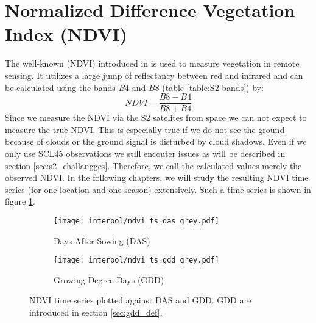 \section{Normalized Difference Vegetation Index (NDVI)}{%
	The well-known  ({NDVI}) introduced in \cite{rouseMonitoringVernalAdvancement1974} is used to measure vegetation in remote sensing. It utilizes a large jump of reflectancy between red and infrared and can be calculated using the bands $B4$ and $B8$ (table \ref{table:S2-bands}) by:
	\begin{equation}
		NDVI = \frac{B8 - B4}{B8 + B4}
		\label{eq:ndvi}
	\end{equation}
	Since we measure the NDVI via the S2 satelites from space we can not expect to measure the true NDVI. This is especially true if we do not see the ground because of clouds or the ground signal is disturbed by cloud shadows. Even if we only use SCL45 observations we still encouter issues as will be described in section \ref{sec:s2_challangges}. Therefore, we call the calculated values merely the {observed NDVI}. In the following chapters, we will study the resulting NDVI time series (for one location and one season) extensively. Such a time series is shown in figure \ref{interpol/ndvi_ts_das_grey.pdf}.
	\begin{figure}[!h]
		\centering
		\begin{subfigure}{.47\textwidth}
			\texttt{[image: interpol/ndvi\_ts\_das\_grey.pdf]}
			\caption{Days After Sowing (DAS)}
			\label{interpol/ndvi_ts_das_grey.pdf}
		\end{subfigure}%
		\hfill
		\begin{subfigure}{.47\textwidth}
			\texttt{[image: interpol/ndvi\_ts\_gdd\_grey.pdf]}
			\caption{Growing Degree Days (GDD)}
			\label{interpol/ndvi_ts_gdd_grey.pdf}
		\end{subfigure}
		\caption{NDVI time series plotted against DAS and GDD. GDD are introduced in section \ref{sec:gdd_def}.}
		\label{fig:raw_ndvi_ts}
	\end{figure}
}

